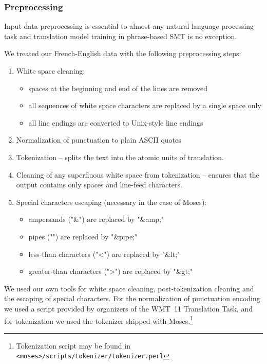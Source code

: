 \subsubsection*{Preprocessing}

Input data preprocessing is essential to almost any natural language processing task
and translation model training in phrase-based SMT is no exception.

We treated our French-English data with the following preprocessing steps:
\begin{enumerate}
  \item White space cleaning:
  \begin{itemize}
    \item spaces at the beginning and end of the lines are removed
    \item all sequences of white space characters are replaced by a single space only
    \item all line endings are converted to Unix-style line endings
  \end{itemize}
  \item Normalization of punctuation to plain ASCII quotes
  \item Tokenization -- splits the text into the atomic units of translation.
  \item Cleaning of any superfluous white space from tokenization -- ensures that the output contains only spaces and line-feed characters.
  \item Special characters escaping (necessary in the case of Moses):
  \begin{itemize}
    \item ampersands ("\&") are replaced by "\&amp;"
    \item pipes ("\textbar") are replaced by "\&pipe;"
    \item less-than characters ("<") are replaced by "\&lt;"
    \item greater-than characters (">") are replaced by "\&gt;"
  \end{itemize}
\end{enumerate}

We used our own tools for white space cleaning, post-tokenization cleaning
and the escaping of special characters.
For the normalization of punctuation encoding we used a script provided by organizers of
the WMT~11 Translation Task,
and for tokenization we used the tokenizer shipped with
Moses.\footnote{Tokenization script may be found in \texttt{<moses>/scripts/tokenizer/tokenizer.perl}}

